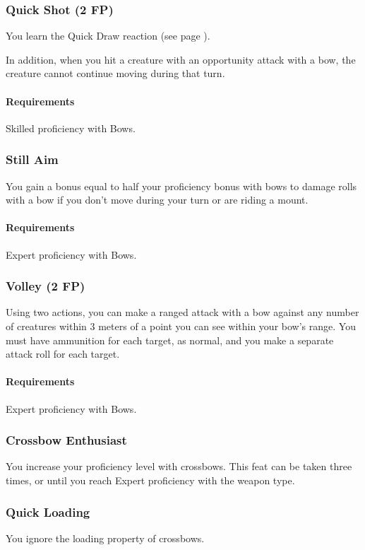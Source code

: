 \subsubsection{Quick Shot (2 FP)} \label{feat::quickshot}
    You learn the Quick Draw reaction (see page \pageref{act::quickdraw}).

    In addition, when you hit a creature with an opportunity attack with a bow, the creature cannot continue moving during that turn.
    \paragraph{Requirements} Skilled proficiency with Bows.
\subsubsection{Still Aim} \label{feat::stillaim}
    You gain a bonus equal to half your proficiency bonus with bows to damage rolls with a bow if you don't move during your turn or are riding a mount.
    \paragraph{Requirements} Expert proficiency with Bows.
\subsubsection{Volley (2 FP)} \label{feat::volley}
    Using two actions, you can make a ranged attack with a bow against any number of creatures within 3 meters of a point you can see within your bow's range.
    You must have ammunition for each target, as normal, and you make a separate attack roll for each target.
    \paragraph{Requirements} Expert proficiency with Bows.
\subsubsection{Crossbow Enthusiast} \label{feat::crossbowenthusiast}
    You increase your proficiency level with crossbows.
    This feat can be taken three times, or until you reach Expert proficiency with the weapon type.
\subsubsection{Quick Loading} \label{feat::quickloading}
    You ignore the loading property of crossbows.
